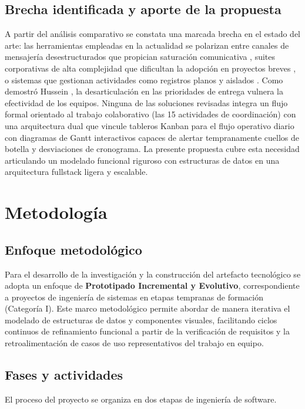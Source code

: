 \documentclass[conference]{IEEEtran}
\begin{document}
\subsection{Brecha identificada y aporte de la propuesta}
A partir del análisis comparativo se constata una marcada brecha en el estado del arte: las herramientas empleadas en la actualidad se polarizan entre canales de mensajería desestructurados que propician saturación comunicativa \cite{vilches2019limitaciones}, suites corporativas de alta complejidad que dificultan la adopción en proyectos breves \cite{sobaih2021responses}, o sistemas que gestionan actividades como registros planos y aislados \cite{akram2024gams, nurzi2022task}. Como demostró Hussein \cite{hussein2021addressing}, la desarticulación en las prioridades de entrega vulnera la efectividad de los equipos. Ninguna de las soluciones revisadas integra un flujo formal orientado al trabajo colaborativo (las 15 actividades de coordinación) con una arquitectura dual que vincule tableros Kanban para el flujo operativo diario con diagramas de Gantt interactivos capaces de alertar tempranamente cuellos de botella y desviaciones de cronograma. La presente propuesta cubre esta necesidad articulando un modelado funcional riguroso con estructuras de datos en una arquitectura fullstack ligera y escalable.

\section{Metodología}
\subsection{Enfoque metodológico}
Para el desarrollo de la investigación y la construcción del artefacto tecnológico se adopta un enfoque de \textbf{Prototipado Incremental y Evolutivo}, correspondiente a proyectos de ingeniería de sistemas en etapas tempranas de formación (Categoría I). Este marco metodológico permite abordar de manera iterativa el modelado de estructuras de datos y componentes visuales, facilitando ciclos continuos de refinamiento funcional a partir de la verificación de requisitos y la retroalimentación de casos de uso representativos del trabajo en equipo.

\subsection{Fases y actividades}
El proceso del proyecto se organiza en dos etapas de ingeniería de software.
\end{document}
